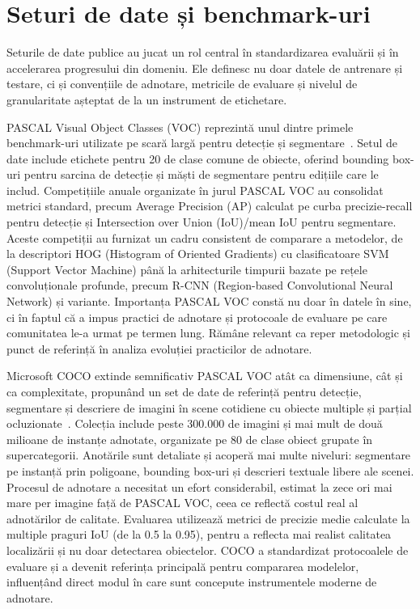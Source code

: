 \section{Seturi de date și benchmark-uri}

Seturile de date publice au jucat un rol central în standardizarea evaluării și în accelerarea progresului din domeniu. Ele definesc nu doar datele de antrenare și testare, ci și convențiile de adnotare, metricile de evaluare și nivelul de granularitate așteptat de la un instrument de etichetare.

PASCAL Visual Object Classes (VOC) reprezintă unul dintre primele benchmark-uri utilizate pe scară largă pentru detecție și segmentare~\cite{10.1007/s11263-009-0275-4}. Setul de date include etichete pentru 20 de clase comune de obiecte, oferind bounding box-uri pentru sarcina de detecție și măști de segmentare pentru edițiile care le includ. Competițiile anuale organizate în jurul PASCAL VOC au consolidat metrici standard, precum Average Precision (AP) calculat pe curba precizie-recall pentru detecție și Intersection over Union (IoU)/mean IoU pentru segmentare. Aceste competiții au furnizat un cadru consistent de comparare a metodelor, de la descriptori HOG (Histogram of Oriented Gradients) cu clasificatoare SVM (Support Vector Machine) până la arhitecturile timpurii bazate pe rețele convoluționale profunde, precum R-CNN (Region-based Convolutional Neural Network) și variante. Importanța PASCAL VOC constă nu doar în datele în sine, ci în faptul că a impus practici de adnotare și protocoale de evaluare pe care comunitatea le-a urmat pe termen lung. Rămâne relevant ca reper metodologic și punct de referință în analiza evoluției practicilor de adnotare.

Microsoft COCO extinde semnificativ PASCAL VOC atât ca dimensiune, cât și ca complexitate, propunând un set de date de referință pentru detecție, segmentare și descriere de imagini în scene cotidiene cu obiecte multiple și parțial ocluzionate~\cite{lin2015microsoftcococommonobjects}. Colecția include peste 300.000 de imagini și mai mult de două milioane de instanțe adnotate, organizate pe 80 de clase obiect grupate în supercategorii. Anotările sunt detaliate și acoperă mai multe niveluri: segmentare pe instanță prin poligoane, bounding box-uri și descrieri textuale libere ale scenei. Procesul de adnotare a necesitat un efort considerabil, estimat la zece ori mai mare per imagine față de PASCAL VOC, ceea ce reflectă costul real al adnotărilor de calitate. Evaluarea utilizează metrici de precizie medie calculate la multiple praguri IoU (de la 0.5 la 0.95), pentru a reflecta mai realist calitatea localizării și nu doar detectarea obiectelor. COCO a standardizat protocoalele de evaluare și a devenit referința principală pentru compararea modelelor, influențând direct modul în care sunt concepute instrumentele moderne de adnotare.

